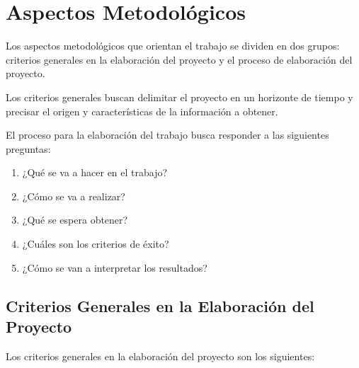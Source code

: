 \section{Aspectos Metodológicos}
\label{sec:intro:AspectosMetodologicos}

Los aspectos metodológicos que orientan el trabajo se dividen en dos grupos: criterios generales en la elaboración del proyecto y el proceso de elaboración del proyecto.

Los criterios generales buscan delimitar el proyecto en un horizonte de tiempo y precisar el origen y características de la información a obtener.

El proceso para la elaboración del trabajo busca responder a las siguientes preguntas: %

\begin{enumerate}
	\item ¿Qué se va a hacer en el trabajo?
	\item ¿Cómo se va a realizar?
	\item ¿Qué se espera obtener?
	\item ¿Cuáles son los criterios de éxito?
	\item ¿Cómo se van a interpretar los resultados?
\end{enumerate}

\subsection{Criterios Generales en la Elaboración del Proyecto}

Los criterios generales en la elaboración del proyecto son los siguientes:

